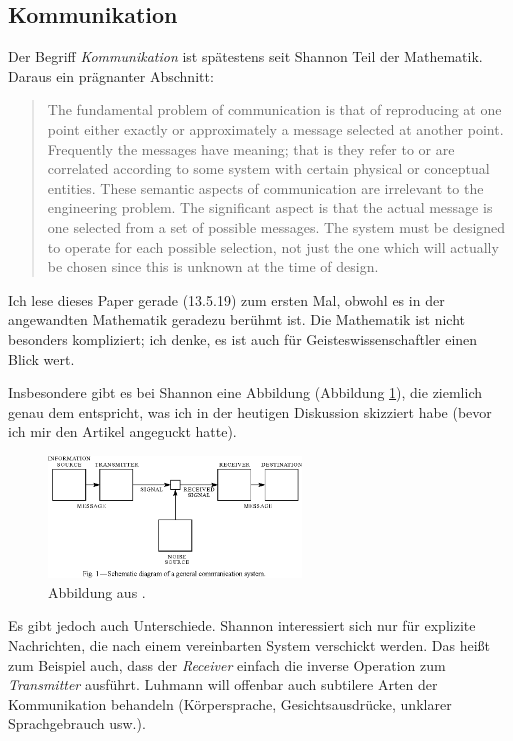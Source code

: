 \documentclass[a4paper, 10pt]{amsart}
\begin{document}
\subsection{Kommunikation}
Der Begriff \emph{Kommunikation} ist sp\"atestens seit Shannon \cite{shannon1948mathematical} Teil der Mathematik. Daraus ein pr\"agnanter Abschnitt:
\begin{quotation}
The fundamental problem of communication is that of reproducing at one point either exactly or approximately a message selected at another point. Frequently the messages have meaning; that is they refer to or are correlated according to some system with certain physical or conceptual entities.  These semantic aspects of communication are irrelevant to the engineering problem. The significant aspect is that the actual message is one selected from a set of possible messages. The system must be designed to operate for each possible selection, not just the one which will actually be chosen since this is unknown at the time of design.
\end{quotation}
Ich lese dieses Paper gerade (13.5.19) zum ersten Mal, obwohl es in der angewandten Mathematik geradezu ber\"uhmt ist. Die Mathematik ist nicht besonders kompliziert; ich denke, es ist auch f\"ur Geisteswissenschaftler einen Blick wert.

Insbesondere gibt es bei Shannon eine Abbildung (Abbildung \ref{fig:shannon-1}), die ziemlich genau dem entspricht, was ich in der heutigen Diskussion skizziert habe (bevor ich mir den Artikel angeguckt hatte).

\begin{figure}
\centering
\includegraphics[width=0.6\textwidth]{figures/shannon-1.eps}
\caption{Abbildung aus \cite{shannon1948mathematical}.\label{fig:shannon-1}}
\end{figure}

Es gibt jedoch auch Unterschiede. Shannon interessiert sich nur f\"ur explizite Nachrichten, die nach einem vereinbarten System verschickt werden. Das hei{\ss}t zum Beispiel auch, dass der \emph{Receiver} einfach die inverse Operation zum \emph{Transmitter} ausf\"uhrt. Luhmann will offenbar auch subtilere Arten der Kommunikation behandeln (K\"orpersprache, Gesichtsausdr\"ucke, unklarer Sprachgebrauch usw.).
\end{document}
